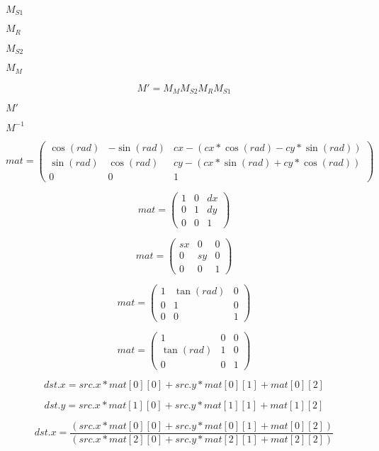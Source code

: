 \documentclass{article}
\begin{document}
{$M_{S1}$
\pagebreak

$M_{R}$
\pagebreak

$M_{S2}$
\pagebreak

$M_{M}$
\pagebreak

\[ M' = M_{M} M_{S2} M_{R} M_{S1} \]
\pagebreak

$M'$
\pagebreak

$M^{-1}$
\pagebreak

\[ mat = \left( \begin{array}{ccc} \cos(rad) & -\sin(rad) & cx - ( cx*\cos(rad) - cy*\sin(rad) ) \\ \sin(rad) & \cos(rad) & cy - ( cx*\sin(rad) + cy*\cos(rad) ) \\ 0 & 0 & 1 \end{array}\right) \]
\pagebreak

\[ mat = \left( \begin{array}{ccc} 1 & 0 & dx \\ 0 & 1 & dy \\ 0 & 0 & 1 \end{array}\right) \]
\pagebreak

\[ mat = \left( \begin{array}{ccc} sx & 0 & 0 \\ 0 & sy & 0 \\ 0 & 0 & 1 \end{array}\right) \]
\pagebreak

\[ mat = \left( \begin{array}{ccc} 1 & \tan(rad) & 0 \\ 0 & 1 & 0 \\ 0 & 0 & 1 \end{array}\right) \]
\pagebreak

\[ mat = \left( \begin{array}{ccc} 1 & 0 & 0 \\ \tan(rad) & 1 & 0 \\ 0 & 0 & 1 \end{array}\right) \]
\pagebreak

\[ dst.x = src.x * mat\left[ 0 \right]\left[ 0 \right] + src.y * mat\left[ 0 \right]\left[ 1 \right] + mat\left[ 0 \right]\left[ 2 \right] \]
\pagebreak

\[ dst.y = src.x * mat\left[ 1 \right]\left[ 0 \right] + src.y * mat\left[ 1 \right]\left[ 1 \right] + mat\left[ 1 \right]\left[ 2 \right] \]
\pagebreak

\[ dst.x = \frac{\left( src.x * mat\left[ 0 \right]\left[ 0 \right] + src.y * mat\left[ 0 \right]\left[ 1 \right] + mat\left[ 0 \right]\left[ 2 \right] \right)} {\left( src.x * mat\left[ 2 \right]\left[ 0 \right] + src.y * mat\left[ 2 \right]\left[ 1 \right] + mat\left[ 2 \right]\left[ 2 \right] \right)} \]
\pagebreak

}
\end{document}
